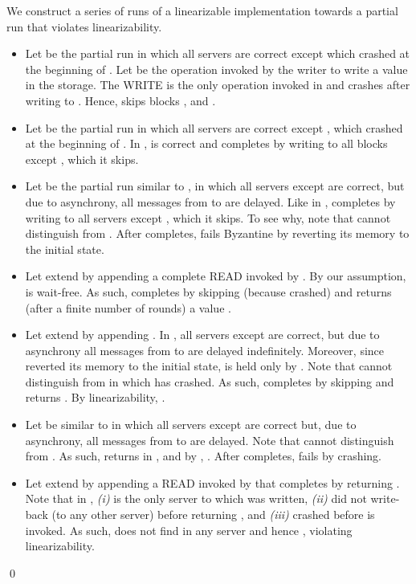 \documentclass[10pt,conference,compsocconf]{IEEEtran}
\newenvironment{prooff}{\vspace{1ex}\noindent{\bf Proof:}\hspace{0.5em}}
	{\hfill\qed\vspace{1em}}
\begin{document}
\begin{prooff}
We construct a series of runs of a linearizable implementation  towards a partial run that violates linearizability.
\begin{itemize}
\item Let  be the partial run in which all servers are correct except  which crashed at the beginning of . Let  be the operation invoked by the writer  to write a value  in the storage. The \textsc{WRITE}  is the only operation invoked in  and  crashes after writing  to . Hence,  skips blocks ,  and .
\item Let  be the partial run in which all servers are correct except , which crashed at the beginning of . In ,  is correct and  completes by writing  to all blocks except , which it skips.
\item Let  be the partial run similar to , in which all servers except  are correct, but due to asynchrony, all messages from  to  are delayed. Like in ,  completes by writing  to all servers except , which it skips. To see why, note that  cannot distinguish  from . After  completes,  fails Byzantine by reverting its memory to the initial state.
\item Let  extend  by appending a complete \textsc{READ}  invoked by . By our assumption,  is wait-free. As such,  completes by skipping  (because  crashed) and returns (after a finite number of rounds) a value .
\item Let  extend  by appending . In , all servers except  are correct, but due to asynchrony all messages from  to  are delayed indefinitely. Moreover, since  reverted its memory to the initial state,  is held only by . Note that  cannot distinguish  from  in which  has crashed. As such,  completes by skipping  and returns . By linearizability, .
\item Let  be similar to  in which all servers except  are correct but, due to asynchrony, all messages from  to  are delayed. Note that  cannot distinguish  from . As such,  returns  in , and by , . After  completes,  fails by crashing.
\item Let  extend  by appending a \textsc{READ}  invoked by  that completes by returning . Note that in , \emph{(i)}  is the only server to which  was written, \emph{(ii)}  did not write-back  (to any other server) before returning , and \emph{(iii)}  crashed before  is invoked. As such,  does not find  in any server and hence , violating linearizability.
\end{itemize}
\vspace{-1.5 em}
\end{prooff}
\end{document}
